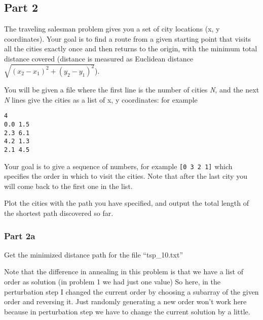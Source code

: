 \documentclass[11pt]{article}
\begin{document}
    \hypertarget{part-2}{%
\subsection{Part 2}\label{part-2}}

The traveling salesman problem gives you a set of city locations (x, y
coordinates). Your goal is to find a route from a given starting point
that visits all the cities exactly once and then returns to the origin,
with the minimum total distance covered (distance is measured as
Euclidean distance \(\sqrt{(x_2-x_1)^2 + (y_2-y_1)^2}\)).

You will be given a file where the first line is the number of cities
\emph{N}, and the next \emph{N} lines give the cities as a list of x, y
coordinates: for example

\begin{verbatim}
4
0.0 1.5
2.3 6.1
4.2 1.3
2.1 4.5
\end{verbatim}

Your goal is to give a sequence of numbers, for example
\texttt{{[}0\ 3\ 2\ 1{]}} which specifies the order in which to visit
the cities. Note that after the last city you will come back to the
first one in the list.

Plot the cities with the path you have specified, and output the total
length of the shortest path discovered so far.

    \hypertarget{part-2a}{%
\subsubsection{Part 2a}\label{part-2a}}

Get the minimized distance path for the file ``tsp\_10.txt''

    Note that the difference in annealing in this problem is that we have a
list of order as solution (in problem 1 we had just one value) So here,
in the perturbation step I changed the current order by choosing a
subarray of the given order and reversing it. Just randomly generating a
new order won't work here because in perturbation step we have to change
the current solution by a little.
\end{document}
